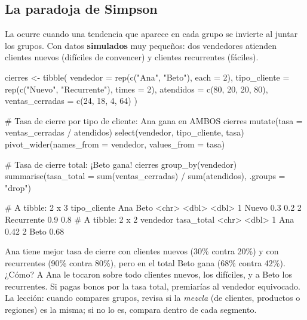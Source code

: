 \subsection{La paradoja de Simpson}

La  ocurre cuando una tendencia que aparece en
cada grupo se invierte al juntar los grupos. Con datos \textbf{simulados} muy
pequeños: dos vendedores atienden clientes nuevos (difíciles de convencer) y
clientes recurrentes (fáciles).

\begin{rcode}
cierres <- tibble(
  vendedor = rep(c("Ana", "Beto"), each = 2),
  tipo_cliente = rep(c("Nuevo", "Recurrente"), times = 2),
  atendidos = c(80, 20, 20, 80),
  ventas_cerradas = c(24, 18, 4, 64)
)

# Tasa de cierre por tipo de cliente: Ana gana en AMBOS
cierres %
  mutate(tasa = ventas_cerradas / atendidos) %
  select(vendedor, tipo_cliente, tasa) %
  pivot_wider(names_from = vendedor, values_from = tasa)

# Tasa de cierre total: ¡Beto gana!
cierres %
  group_by(vendedor) %
  summarise(tasa_total = sum(ventas_cerradas) / sum(atendidos),
            .groups = "drop")
\end{rcode}
\begin{rsalida}
# A tibble: 2 x 3
  tipo_cliente   Ana  Beto
  <chr>        <dbl> <dbl>
1 Nuevo          0.3   0.2
2 Recurrente     0.9   0.8
# A tibble: 2 x 2
  vendedor tasa_total
  <chr>         <dbl>
1 Ana            0.42
2 Beto           0.68
\end{rsalida}

Ana tiene mejor tasa de cierre con clientes nuevos (30\% contra 20\%) y con
recurrentes (90\% contra 80\%), pero en el total Beto gana (68\% contra
42\%). ¿Cómo? A Ana le tocaron sobre todo clientes nuevos, los difíciles, y a
Beto los recurrentes. Si pagas bonos por la tasa total, premiarías al
vendedor equivocado. La lección: cuando compares grupos, revisa si la
\emph{mezcla} (de clientes, productos o regiones) es la misma; si no lo es,
compara dentro de cada segmento.

